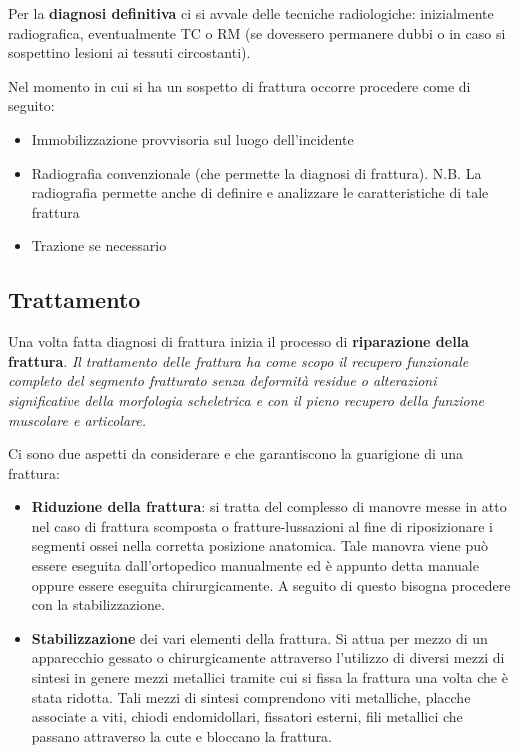 Per la \textbf{diagnosi definitiva} ci si avvale delle tecniche radiologiche: inizialmente radiografica, eventualmente TC o RM (se dovessero permanere dubbi o in caso si sospettino lesioni ai tessuti circostanti).

Nel momento in cui si ha un sospetto di frattura occorre procedere come di seguito:

\begin{itemize}
\item
  Immobilizzazione provvisoria sul luogo dell'incidente
\item
  Radiografia convenzionale (che permette la diagnosi di frattura).
N.B. La radiografia permette anche di definire e analizzare le caratteristiche di tale frattura
\item
  Trazione se necessario
\end{itemize}


\subsection{Trattamento}

Una volta fatta diagnosi di frattura inizia il processo di \textbf{riparazione della frattura}. \emph{Il trattamento delle frattura ha come scopo il recupero funzionale completo del segmento fratturato senza deformità residue o alterazioni significative della morfologia scheletrica e con il pieno recupero della funzione muscolare e articolare.}

Ci sono due aspetti da considerare e che garantiscono la guarigione di una frattura:

\begin{itemize}
\item
  \textbf{Riduzione della frattura}: si tratta del complesso di manovre messe in atto nel caso di frattura scomposta o fratture-lussazioni al fine di riposizionare i segmenti ossei nella corretta posizione anatomica. Tale manovra viene può essere eseguita dall'ortopedico manualmente ed è appunto detta manuale oppure essere eseguita chirurgicamente. A seguito di questo bisogna procedere con la stabilizzazione.

\item
  \textbf{Stabilizzazione} dei vari elementi della frattura. Si attua per mezzo di un apparecchio gessato o chirurgicamente attraverso l'utilizzo di diversi mezzi di sintesi in genere mezzi metallici tramite cui si fissa la frattura una volta che è stata ridotta. Tali mezzi di sintesi comprendono viti metalliche, placche associate a viti, chiodi endomidollari, fissatori esterni, fili metallici che passano attraverso la cute e bloccano la frattura.
\end{itemize}

